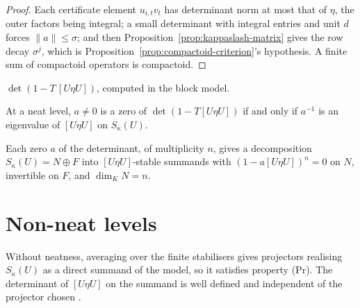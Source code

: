 \begin{proof}
  \leanok
  Each certificate element $u_{i,t}v_t$ has determinant norm at most that of $\eta$, the outer
  factors being integral; a small determinant with integral entries and unit $d$ forces
  $\lVert a \rVert \leq \sigma$; and then Proposition~\ref{prop:kappaslash-matrix} gives the row
  decay $\sigma^j$, which is Proposition~\ref{prop:compactoid-criterion}'s hypothesis.  A finite
  sum of compactoid operators is compactoid.
\end{proof}

\begin{definition}
  \label{def:heckecharpowerseries}
  \leanok
  $\det(1 - T\,[U\eta U])$, computed in the block model.
\end{definition}

\begin{theorem}
  \label{thm:qmf-eigenform-criterion}
  \leanok
  At a neat level, $a \neq 0$ is a zero of $\det(1 - T[U\eta U])$ if and only if $a^{-1}$ is an
  eigenvalue of $[U\eta U]$ on $S_\kappa(U)$.
\end{theorem}

\begin{theorem}
  \label{thm:qmf-riesz}
  \leanok
  Each zero $a$ of the determinant, of multiplicity $n$, gives a decomposition $S_\kappa(U) = N
  \oplus F$ into $[U\eta U]$-stable summands with $(1 - a[U\eta U])^n = 0$ on $N$, invertible on
  $F$, and $\dim_K N = n$.
\end{theorem}

\section{Non-neat levels}
\label{sec:pr}

\begin{proposition}
  \label{prop:pr}
  \leanok
  Without neatness, averaging over the finite stabilisers gives projectors realising
  $S_\kappa(U)$ as a direct summand of the model, so it satisfies property (Pr).  The
  determinant of $[U\eta U]$ on the summand is well defined and independent of the projector
  chosen \cite[Lemma 2.12]{Buzzard}.
\end{proposition}

